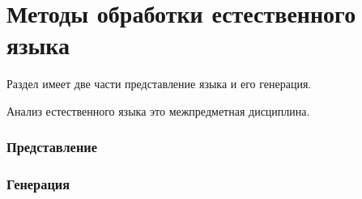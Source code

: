 \chapter{Методы обработки естественного языка}

Раздел имеет две части представление языка и его генерация.

Анализ естественного языка это межпредметная дисциплина.

\subsection{Представление}


\subsection{Генерация}

